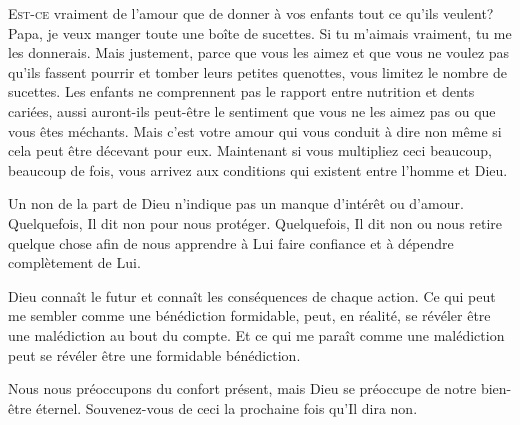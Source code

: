 \lettrine{E}{st-ce} vraiment de l'amour que de donner à vos enfants
 tout ce qu'ils veulent?
 \Og Papa, je veux manger toute une boîte de sucettes.
 Si tu m'aimais vraiment, tu me les donnerais. \Fg{}
 Mais justement, parce que vous les aimez et que vous ne voulez pas
 qu'ils fassent pourrir et tomber leurs petites quenottes,
 vous limitez le nombre de sucettes.
 Les enfants ne comprennent pas le rapport entre nutrition et dents cariées,
 aussi auront-ils peut-être le sentiment que vous ne les aimez pas
 ou que vous êtes méchants. Mais c'est votre amour qui vous conduit à dire
 \Og non \Fg{} même si cela peut être décevant pour eux.
 Maintenant si vous multipliez ceci beaucoup, beaucoup de fois,
 vous arrivez aux conditions qui existent entre l'homme et Dieu. 


Un \Og non \Fg{} de la part de Dieu n'indique pas un 
 manque d'intérêt ou d'amour.
 Quelquefois, Il dit \Og non \Fg{} pour nous protéger.
 Quelquefois, Il dit \Og non \Fg{} ou nous retire quelque chose
 afin de nous apprendre à Lui faire confiance
 et à dépendre complètement de Lui. 

Dieu connaît le futur et connaît les conséquences de chaque action.
 Ce qui peut me sembler comme une bénédiction formidable, peut,
 en réalité, se révéler être une malédiction au bout du compte.
 Et ce qui me paraît comme une malédiction peut se révéler
 être une formidable bénédiction. 

Nous nous préoccupons du confort présent, mais Dieu se préoccupe
 de notre bien-être éternel.
 Souvenez-vous de ceci la prochaine fois qu'Il dira \Og non. \Fg{}

\dvrule






